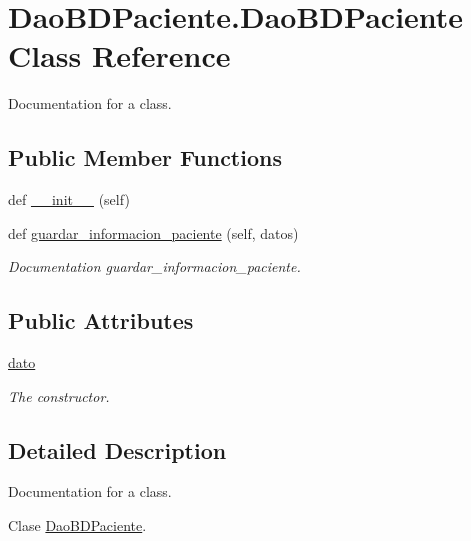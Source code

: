 \hypertarget{class_dao_b_d_paciente_1_1_dao_b_d_paciente}{}\section{Dao\+B\+D\+Paciente.\+Dao\+B\+D\+Paciente Class Reference}
\label{class_dao_b_d_paciente_1_1_dao_b_d_paciente}


Documentation for a class.  


\subsection*{Public Member Functions}
\begin{DoxyCompactItemize}
\item 
def \mbox{\hyperlink{class_dao_b_d_paciente_1_1_dao_b_d_paciente_a86886774d1498857ed82b3f872b245ba}{\+\_\+\+\_\+init\+\_\+\+\_\+}} (self)
\item 
def \mbox{\hyperlink{class_dao_b_d_paciente_1_1_dao_b_d_paciente_aae9bd6b75ec17367181453538188b632}{guardar\+\_\+informacion\+\_\+paciente}} (self, datos)
\begin{DoxyCompactList}\small\item\em Documentation guardar\+\_\+informacion\+\_\+paciente. \end{DoxyCompactList}\end{DoxyCompactItemize}
\subsection*{Public Attributes}
\begin{DoxyCompactItemize}
\item 
\mbox{\hyperlink{class_dao_b_d_paciente_1_1_dao_b_d_paciente_ad7ab0cc34e82d6fad753aeaee971f86a}{dato}}
\begin{DoxyCompactList}\small\item\em The constructor. \end{DoxyCompactList}\end{DoxyCompactItemize}


\subsection{Detailed Description}
Documentation for a class. 

Clase \mbox{\hyperlink{class_dao_b_d_paciente_1_1_dao_b_d_paciente}{Dao\+B\+D\+Paciente}}. 

